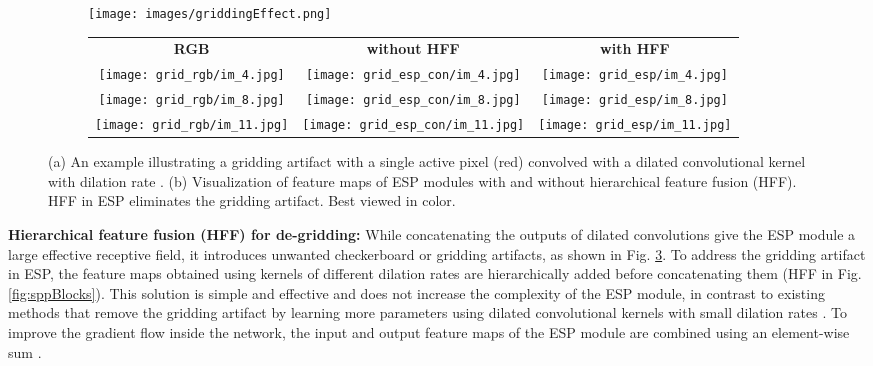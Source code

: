 \documentclass[runningheads]{llncs}
\def\Fig{Fig. }
\begin{document}
\begin{figure}[t!]
\centering
\begin{subfigure}[b]{0.22\columnwidth}
\centering
\texttt{[image: images/griddingEffect.png]}
\caption{}
\label{fig:gridArtifact}
\end{subfigure}
\hfill
\begin{subfigure}[b]{0.77\columnwidth}
  \centering
	\begin{tabular}{ccc}
    \textbf{RGB} & \textbf{without HFF} & \textbf{with HFF} \\
    \texttt{[image: grid\_rgb/im\_4.jpg]} & \texttt{[image: grid\_esp\_con/im\_4.jpg]} & \texttt{[image: grid\_esp/im\_4.jpg]}  \\
    \texttt{[image: grid\_rgb/im\_8.jpg]} & \texttt{[image: grid\_esp\_con/im\_8.jpg]} & \texttt{[image: grid\_esp/im\_8.jpg]}  \\
    \texttt{[image: grid\_rgb/im\_11.jpg]} & \texttt{[image: grid\_esp\_con/im\_11.jpg]} & \texttt{[image: grid\_esp/im\_11.jpg]}  \\
    \end{tabular}
  \caption{}
\label{fig:gridArtExm}
\end{subfigure}
\caption{(a) An example illustrating a gridding artifact with a single active pixel (red) convolved with a  dilated convolutional kernel with dilation rate . (b) Visualization of feature maps of ESP modules with and without hierarchical feature fusion (HFF). HFF in ESP eliminates the gridding artifact. Best viewed in color.}
\label{fig:gridArtExmamination}
\end{figure}

\noindent \textbf{Hierarchical feature fusion (HFF) for de-gridding:} While concatenating the outputs of dilated convolutions give the ESP module a large effective receptive field, it introduces unwanted checkerboard or gridding artifacts, as shown in \Fig \ref{fig:gridArtExmamination}. To address the gridding artifact in ESP, the feature maps obtained using kernels of different dilation rates are hierarchically added before concatenating them (HFF in \Fig \ref{fig:sppBlocks}). This solution is simple and effective and does not increase the complexity of the ESP module, in contrast to  existing methods that remove the gridding artifact by learning more parameters using dilated convolutional kernels with small dilation rates \cite{yu2017dilated,wang2017understanding}. To improve the gradient flow inside the network, the input and output feature maps of the ESP module are combined using an element-wise sum \cite{he2016deep}.
\end{document}
